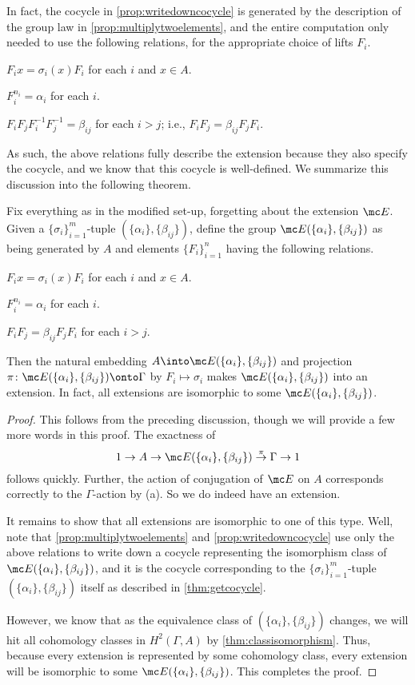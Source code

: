 \documentclass{article}
\numberwithin{equation}{section}
\begin{document}
In fact, the cocycle in \autoref{prop:writedowncocycle} is generated by the description of the group law in \autoref{prop:multiplytwoelements}, and the entire computation only needed to use the following relations, for the appropriate choice of lifts $F_i$.
\begin{listalph}
	\item $F_ix=\sigma_i(x)F_i$ for each $i$ and $x\in A$.
	\item $F_i^{n_i}=\alpha_i$ for each $i$.
	\item $F_iF_jF_i^{-1}F_j^{-1}=\beta_{ij}$ for each $i>j$; i.e., $F_iF_j=\beta_{ij}F_jF_i$.
\end{listalph}
As such, the above relations fully describe the extension because they also specify the cocycle, and we know that this cocycle is well-defined. We summarize this discussion into the following theorem.
\begin{theorem}
	Fix everything as in the modified set-up, forgetting about the extension $\mc E$. Given a $\{\sigma_i\}_{i=1}^m$-tuple $(\{\alpha_i\},\{\beta_{ij}\})$, define the group $\mc E(\{\alpha_i\},\{\beta_{ij}\})$ as being generated by $A$ and elements $\{F_i\}_{i=1}^n$ having the following relations.
	\begin{listalph}
		\item $F_ix=\sigma_i(x)F_i$ for each $i$ and $x\in A$.
		\item $F_i^{n_i}=\alpha_i$ for each $i$.
		\item $F_iF_j=\beta_{ij}F_jF_i$ for each $i>j$.
	\end{listalph}
	Then the natural embedding $A\into\mc E(\{\alpha_i\},\{\beta_{ij}\})$ and projection $\pi\colon\mc E(\{\alpha_i\},\{\beta_{ij}\})\onto\Gamma$ by $F_i\mapsto\sigma_i$ makes $\mc E(\{\alpha_i\},\{\beta_{ij}\})$ into an extension. In fact, all extensions are isomorphic to some $\mc E(\{\alpha_i\},\{\beta_{ij}\})$.
\end{theorem}
\begin{proof}
	This follows from the preceding discussion, though we will provide a few more words in this proof. The exactness of
	\[1\to A\to\mc E(\{\alpha_i\},\{\beta_{ij}\})\stackrel\pi\to\Gamma\to1\]
	follows quickly. Further, the action of conjugation of $\mc E$ on $A$ corresponds correctly to the $\Gamma$-action by (a). So we do indeed have an extension.

	It remains to show that all extensions are isomorphic to one of this type. Well, note that \autoref{prop:multiplytwoelements} and \autoref{prop:writedowncocycle} use only the above relations to write down a cocycle representing the isomorphism class of $\mc E(\{\alpha_i\},\{\beta_{ij}\})$, and it is the cocycle corresponding to the $\{\sigma_i\}_{i=1}^m$-tuple $(\{\alpha_i\},\{\beta_{ij}\})$ itself as described in \autoref{thm:getcocycle}.

	However, we know that as the equivalence class of $(\{\alpha_i\},\{\beta_{ij}\})$ changes, we will hit all cohomology classes in $H^2(\Gamma,A)$ by \autoref{thm:classisomorphism}. Thus, because every extension is represented by some cohomology class, every extension will be isomorphic to some $\mc E(\{\alpha_i\},\{\beta_{ij}\})$. This completes the proof.
\end{proof}
\end{document}
